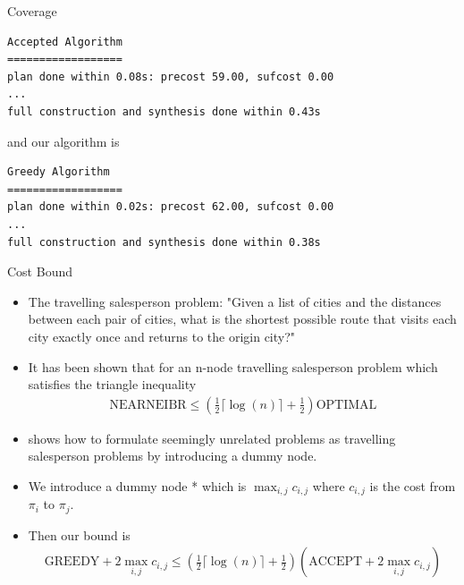 \documentclass{beamer}
\begin{document}
\begin{frame}[fragile]{Coverage}
\begingroup
\fontsize{9pt}{12pt}\selectfont
\begin{lstlisting}
Accepted Algorithm
==================
plan done within 0.08s: precost 59.00, sufcost 0.00
...
full construction and synthesis done within 0.43s 
\end{lstlisting}
\endgroup
and our algorithm is 

\begingroup
\fontsize{9pt}{12pt}\selectfont
\begin{lstlisting}
Greedy Algorithm
==================
plan done within 0.02s: precost 62.00, sufcost 0.00
...
full construction and synthesis done within 0.38s 
\end{lstlisting}
\endgroup
\end{frame}

\begin{frame}{Cost Bound}
\begin{itemize}
\item The travelling salesperson problem: "Given a list of cities and the distances between each pair of cities, what is the shortest possible route that visits each city exactly once and returns to the origin city?"
\item It has been shown \cite{rosenkrantz74} that for an n-node travelling salesperson problem which satisfies the triangle inequality
\begin{align*}
\text{NEARNEIBR} \leq (\frac{1}{2} \lceil \log(n) \rceil + \frac{1}{2})\text{OPTIMAL}
\end{align*}
\item \cite{lenstra75} shows how to formulate seemingly unrelated problems as travelling salesperson problems by introducing a dummy node.
\item We introduce a dummy node * which is $\max_{i,j} c_{i,j}$ where $c_{i,j}$ is the cost from $\pi_i$ to $\pi_j$.
\item Then our bound is  
\begin{align*}
\text{GREEDY} + 2\max_{i,j} c_{i,j} \leq (\frac{1}{2} \lceil \log(n) \rceil + \frac{1}{2}) (\text{ACCEPT} + 2 \max_{i,j} c_{i,j}) \\ 
\end{align*}
\end{itemize}
\end{frame}
\end{document}
